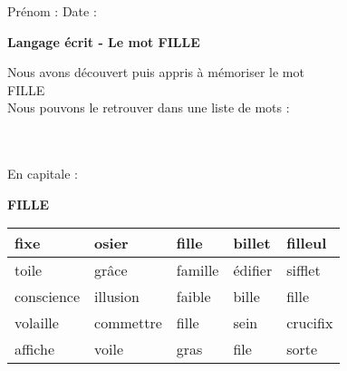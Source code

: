 \documentclass[a4paper, 11pt,oneside, fleqn]{article}
\begin{document}
\newcommand{\x}{\times}
\renewcommand{\arraystretch}{1.5}

\sloppy
\pagestyle{empty}
\begin{onehalfspace}


\sffamily \noindent \Large Pr\'enom : \fbox{\begin{minipage}{9cm} \vspace{1.2cm}\hspace{9cm} \end{minipage}} \hspace{1.5cm}\Large Date :\vspace{2mm}\\
\begin{minipage}{12cm}
\begin{center}
\Large\textbf{Langage \'ecrit - Le mot \MakeUppercase{fille}}
\end{center}
\normalsize Nous avons d\'ecouvert puis appris \`a m\'emoriser le mot\\
\MakeUppercase{fille}\\
Nous pouvons le retrouver dans une liste de mots : \end{minipage}\\
\vspace{0.25cm}\\
 
\large\noindent En capitale :
\begin{center}
{\huge \textbf{\MakeUppercase{fille}}}
\vspace{0.25cm}\\
\begin{tabulary}{17cm}{|g|g|g|g|g|}
\hline
fixe & osier & fille & billet & filleul \\
\hline
toile & grâce & famille & édifier & sifflet \\
\hline
conscience & illusion & faible & bille & fille \\
\hline
volaille & commettre & fille & sein & crucifix \\
\hline
affiche & voile & gras & file & sorte \\
\hline
\end{tabulary}
\end{center}
\vspace{0.5cm}


\end{onehalfspace}
\end{document}
